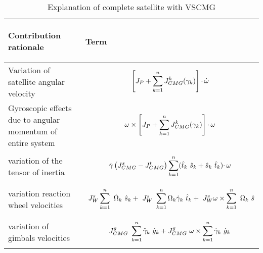 \begin{table}[!h]
\centering
\begin{tabular}{p{}||p{}}
\toprule
\begin{center} Contribution rationale  \end{center}& \begin{center}
     Term
 \end{center} \\
\midrule
Variation of satellite angular velocity & 
\begin{equation*}
\left[ J_{P} +\sum ^{n}_{k=1} J^{k}_{CMG}( \gamma _{k})\right] \cdotp \dot{\omega }
\vspace{-1em}\end{equation*} \\
\hline 
 Gyroscopic effects due to angular momentum of entire system & 
\begin{equation*}
\omega \times \left[ J_{P} +\sum ^{n}_{k=1} J^{k}_{CMG}( \gamma _{k})\right] \cdotp \omega 
\vspace{-1em}\end{equation*} \\
\hline 
 variation of the tensor of inertia & 
\begin{equation*}
\dot{\gamma }\left( J^{s}_{CMG} -J^{t}_{CMG}\right)\sum ^{n}_{k=1}(\hat{t}_{k} \ \hat{s}_{k} +\hat{s}_{k} \ \hat{t}_{k}) \cdotp \omega 
\vspace{-1em}\end{equation*} \\
\hline 
variation reaction wheel velocities & 
\begin{equation*}
\ J^{s}_{W}\sum ^{n}_{k=1} \ \dot{\Omega }_{k} \ \hat{s}_{k} +\ J^{s}_{W} \ \sum ^{n}_{k=1} \Omega _{k}\dot{\gamma }_{k} \ \hat{t}_{k} +\ J^{s}_{W} \omega \times \sum ^{n}_{k=1} \ \Omega _{k} \ \hat{s}
\vspace{-1em}\end{equation*} \\
\hline 
 variation of gimbals velocities & 
\begin{equation*}
J^{g}_{CMG} \ \sum ^{n}_{k=1}\ddot{\gamma }_{k} \ \hat{g}_{k} +J^{g}_{CMG} \ \omega \times \sum ^{n}_{k=1}\dot{\gamma }_{k} \ \hat{g}_{k}
\vspace{-1em}\end{equation*} \\
\bottomrule
\end{tabular}
    \caption{Explanation of complete satellite with VSCMG}
    \label{tab:vscmg_eom_explain}
\end{table}

